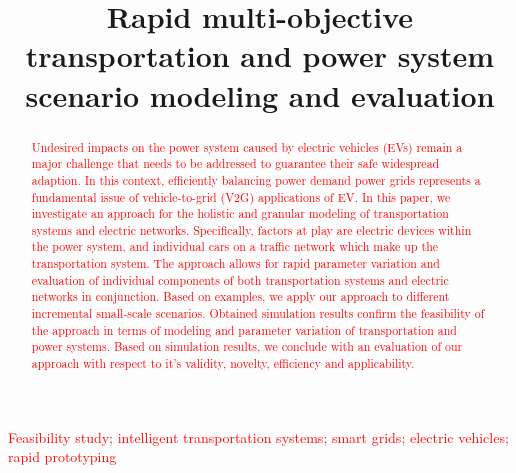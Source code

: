\title{Rapid multi-objective transportation and power system scenario modeling and evaluation}

\author{
	\and
}

\maketitle

\begin{abstract}
\textcolor{red}{
Undesired impacts on the power system caused by electric vehicles (EVs) remain a major challenge that needs to be addressed to guarantee their safe widespread adaption. In this context, efficiently balancing power demand power grids represents a fundamental issue of vehicle-to-grid (V2G) applications of EV. In this paper, we investigate an approach for the holistic and granular modeling of transportation systems and electric networks. Specifically, factors at play are electric devices within the power system, and individual cars on a traffic network which make up the transportation system. The approach allows for rapid parameter variation and evaluation of individual components of both transportation systems and electric networks in conjunction. Based on examples, we apply our approach to different incremental small-scale scenarios. Obtained simulation results confirm the feasibility of the approach in terms of modeling and parameter variation of transportation and power systems. Based on simulation results, we conclude with an evaluation of our approach with respect to it's validity, novelty, efficiency and applicability.
}
\end{abstract}

\begin{keywords}
\textcolor{red}{
Feasibility study; intelligent transportation systems; smart grids; electric vehicles;  rapid prototyping
}
\end{keywords}